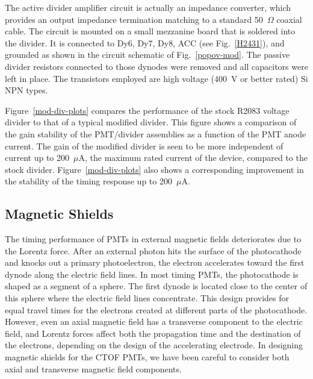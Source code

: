 \documentclass[3p,times,twocolumn]{elsarticle}
\begin{document}
The active divider amplifier circuit is actually an impedance converter, which provides an output impedance
termination matching to a standard 50~$\Omega$ coaxial cable. The circuit is mounted on a small
mezzanine board that is soldered into the divider. It is connected to Dy6, Dy7, Dy8, ACC (see
Fig.~\ref{H2431}), and grounded as shown in the circuit schematic of Fig.~\ref{popov-mod}. The passive
divider resistors connected to those dynodes were removed and all capacitors were left in place. The 
transistors employed are high voltage (400~V or better rated) Si NPN types. 

Figure~\ref{mod-div-plots} compares the performance of the stock R2083 voltage divider to that of a
typical modified divider. This figure shows a comparison of the gain stability of the PMT/divider
assemblies as a function of the PMT anode current. The gain of the modified divider is seen to be more
independent of current up to 200~$\mu$A, the maximum rated current of the device, compared to the
stock divider. Figure~\ref{mod-div-plots} also shows a corresponding improvement in the stability of the
timing response up to 200~$\mu$A.

\subsection{Magnetic Shields}
\label{sec:shields}

The timing performance of PMTs in external magnetic fields deteriorates due to the Lorentz force. After
an external photon hits the surface of the photocathode and knocks out a primary photoelectron, the electron
accelerates toward the first dynode along the electric field lines. In most timing PMTs, the photocathode is
shaped as a segment of a sphere. The first dynode is located close to the center of this sphere where the
electric field lines concentrate. This design provides for equal travel times for the electrons created at
different parts of the photocathode. However, even an axial magnetic field has a transverse component to
the electric field, and Lorentz forces affect both the propagation time and the destination of the electrons, 
depending on the design of the accelerating electrode. In designing magnetic shields for the CTOF PMTs, we
have been careful to consider both axial and transverse magnetic field components.
\end{document}
